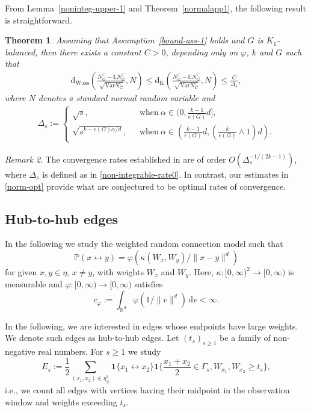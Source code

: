 \documentclass{article}
\newtheorem{theorem}{Theorem}[section]
\theoremstyle{definition}
\numberwithin{equation}{section}
\theoremstyle{remark}
\newtheorem{remark}[theorem]{Remark}
\newcommand{\Var}{\mathrm{Var}}
\begin{document}
From Lemma~\ref{noninteg-upper-1} and Theorem~\ref{normalapp1}, the following result is straightforward. 
\begin{theorem}\label{thm:subgraph-non}
Assuming that Assumption~\ref{bound-ass-1} holds and $G$ is $K_1$-balanced, then there exists a constant $C>0$, depending only on $\varphi$, $k$ and $G$ such that  
\begin{align}
	\label{norm-opt}
	\mathrm{d}_{\mathrm{Wass}}\left(\frac{N_G^{\subset}-\mathbb{E} N_G^{\subset}}{\sqrt{\Var N_G^{\subset}}},N\right)\le \mathrm{d}_{\mathrm{K}}\left(\frac{N_G^{\subset}-\mathbb{E} N_G^{\subset}}{\sqrt{\Var N_G^{\subset}}},N\right)\le\frac{C}{\Delta_s},
\end{align}
where $N$ denotes a standard normal random variable and 
\begin{align}\label{non-integrable-rate0}
\Delta_s:=
\begin{cases}
	\displaystyle
	\sqrt{s}, \ \ \ &\mbox{when}~\alpha\in(0,\frac{k-1}{e(G)}d],\\
	\displaystyle
	\sqrt{s^{k-e(G)\alpha/d}}, \ \ \ &\mbox{when}~\alpha\in\left(\frac{k-1}{e(G)}d,(\frac{k}{e(G)}\wedge 1)d\right).
\end{cases}
\end{align}
\end{theorem}
\begin{remark}
	The convergence rates established in \cite[Theorem~3.5]{LiuPrivault25b} are of order $O(\Delta_s^{-1/(2k-1)})$, where $\Delta_s$ is defined as in \eqref{non-integrable-rate0}. In contrast, our estimates in \eqref{norm-opt} provide what are conjectured to be optimal rates of convergence. 
\end{remark}





\subsection{Hub-to-hub edges}

In the following we study the weighted random connection model such that
$$
\mathbb{P}(x\leftrightarrow y) = \varphi(\kappa(W_x,W_y)/\|x-y\|^d)
$$
for given $x,y\in\eta$, $x\neq y$, with weights $W_x$ and $W_y$. Here, $\kappa: [0,\infty)^2\to[0,\infty)$ is measurable and $\varphi:[0,\infty)\to[0,\infty)$ satisfies
$$
c_\varphi:=\int_{\mathbb{R}^d} \varphi(1/\|v\|^d) \, \mathrm{d}v <\infty.
$$

In the following, we are interested in edges whose endpoints have large weights. We denote such edges as hub-to-hub edges. Let $(t_s)_{s\geq 1}$ be a family of non-negative real numbers. For $s\geq 1$ we study
$$
E_s:= \frac{1}{2} \sum_{(x_1,x_2)\in\eta^2_{\neq}} \mathbf{1}\{ x_1\leftrightarrow x_2 \} \mathbf{1}\bigg\{ \frac{x_1+x_2}{2}\in \Gamma_s, W_{x_1},W_{x_2} \geq t_s \bigg\},
$$
i.e., we count all edges with vertices having their midpoint in the observation window and weights exceeding $t_s$.
\end{document}
